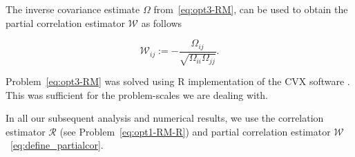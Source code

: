 The inverse covariance estimate $\Omega$ from~\eqref{eq:opt3-RM}, can be used to obtain the partial correlation estimator $\mathcal{W}$ as follows 

\begin{equation}\label{eq:define_partialcor}
    \mathcal{W}_{ij} := -\frac{\Omega_{ij}}{\sqrt{\Omega_{ii} \Omega_{jj}}}.
\end{equation}

Problem~\eqref{eq:opt3-RM} was solved using R implementation of the CVX software \cite{Boyd2004, Fu2017}. This was sufficient for the problem-scales we are dealing with.

In all our subsequent analysis and numerical results, we use the \Robocov{} correlation estimator $\mathcal{R}$ (see Problem~\eqref{eq:opt1-RM-R}) and partial correlation estimator $\mathcal{W}$~\eqref{eq:define_partialcor}.




